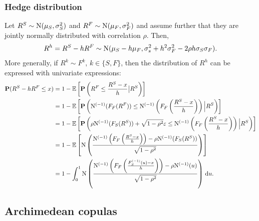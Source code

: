 

    
\subsubsection*{Hedge distribution}
\label{sec:hedge-distribution-gaussian}

Let $R^S\sim {\rm N}(\mu_S, \sigma_S^2)$ and $R^F\sim {\rm N}(\mu_F,
\sigma_F^2)$ and assume further that they are jointly normally
distributed with correlation $\rho$. Then,
\begin{equation*}
  R^h = R^S - h R^F \sim {\rm N}(\mu_S - h \mu_F, \sigma_s^2 + h^2
  \sigma_F^2 - 2\rho h \sigma_S \sigma_F).
\end{equation*}
More generally, if $R^k\sim F^k$, $k\in \{S,F\}$, then the
distribution of $R^h$ can be expressed with univariate
expressions: 
\begin{align*}
  \p(R^S-h R^F\leq x)
  &= 1-\E\left[ \p\left(R^F\leq \frac{R^S-x}{h}\big| R^S\right)\right] \\ %
  &= 1-\E\left[\p \left(\Ncdf^{(-1)}(F_F(R^F)) \leq
    \Ncdf^{(-1)}\left(F_F\left(\frac{R^S-x}{h}\right)\right) \Big|
    R^S\right)\right] \\%
  &= 1-\E\left[ \p\left(\rho \Ncdf^{(-1)}(F_S(R^S)) + \sqrt{1-\rho^2}
    \varepsilon \leq \Ncdf^{(-1)}\left(F_F\left(\frac{R^S-x}{h}\right)\right) \Big|
    R^S\right)\right]\\ %
  &= 1-\E\left[ \Ncdf \left(
    \frac{\Ncdf^{(-1)}\left(F_F\left(\frac{R^S-x}{h}\right)\right) -\rho
    \Ncdf^{(-1)}(F_S(R^S))} { \sqrt{1-\rho^2}}\right)\right]\\
  &= 1-\int_0^1  \Ncdf \left(
    \frac{\Ncdf^{(-1)}\left(F_F\left(\frac{F_S^{(-1)}(u)-x}{h}\right)\right) -\rho
    \Ncdf^{(-1)}(u)} { \sqrt{1-\rho^2}}\right) \,\dd u.
\end{align*}



\subsection{Archimedean copulas}
\label{sec:archimedean-copulas}

